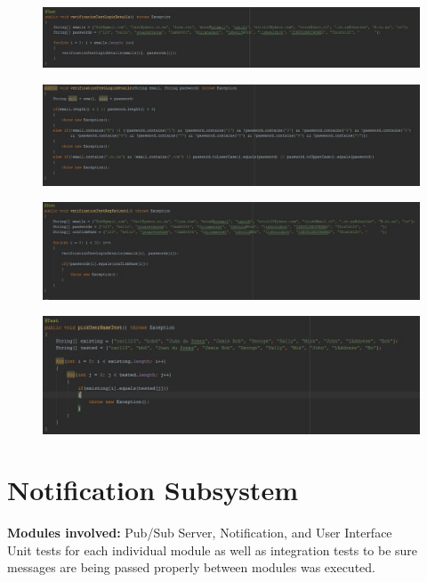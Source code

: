 \documentclass[12pt]{article}
\begin{document}
{\begin{center}
	\begin{figure}[h]
		\includegraphics[width=\textwidth]{tests/usrUI/TestLogin.JPG}
	\end{figure}

	\begin{figure}[h]
		\includegraphics[width=\textwidth]{tests/usrUI/TestLoginFunction.JPG}
	\end{figure}

	\begin{figure}[h]
		\includegraphics[width=\textwidth]{tests/usrUI/TestRegister.JPG}
	\end{figure}

	\begin{figure}[h]
		\includegraphics[width=\textwidth]{tests/usrUI/TestUsername.JPG}
	\end{figure}
	\end{center}


	\section{Notification Subsystem }
	\textbf{Modules involved:} Pub/Sub Server, Notification, and User Interface \\
	Unit tests for each individual module as well as integration tests to be sure messages are being passed properly between modules was executed. 

}
\end{document}
